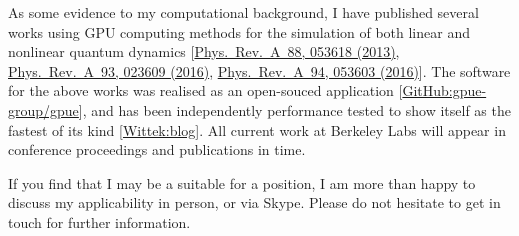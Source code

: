 \documentclass[11pt,a4paper,unicode]{moderncv}
\begin{document}
{    %

    As some evidence to my computational background, I have published several works using GPU computing methods for the simulation of both linear and nonlinear quantum dynamics [\href{http://journals.aps.org/pra/abstract/10.1103/PhysRevA.88.053618}{Phys.~Rev.~A~88, 053618 (2013)}, \href{https://journals.aps.org/pra/abstract/10.1103/PhysRevA.93.023609}{Phys.~Rev.~A~93, 023609 (2016)}, \href{https://journals.aps.org/pra/abstract/10.1103/PhysRevA.94.053603}{Phys.~Rev.~A~94, 053603 (2016)}]. The software for the above works was realised as an open-souced application [\href{https://github.com/gpue-group/gpue}{GitHub:gpue-group/gpue}], and has been independently performance tested to show itself as the fastest of its kind [\href{http://peterwittek.com/gpe-comparison.html}{Wittek:blog}]. All current work at Berkeley Labs will appear in conference proceedings and publications in time.

    If you find that I may be a suitable for a position, I am more than happy to discuss my applicability in person, or via Skype. Please do not hesitate to get in touch for further information.
    \vspace{-0.15cm}
}

\makeletterclosing
\end{document}
